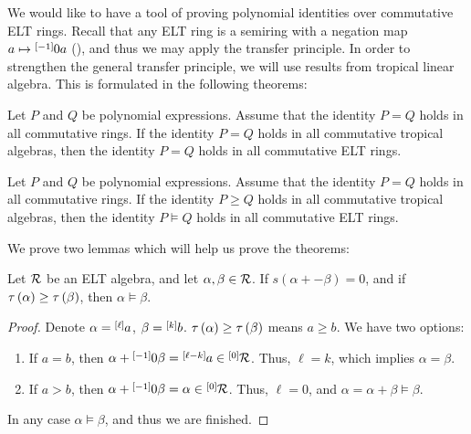 We would like to have a tool of proving polynomial identities over commutative ELT rings. Recall that any ELT ring is a semiring with a negation map $a\mapsto\layer{0}{-1}a$ (), and thus we may apply the transfer principle. In order to strengthen the general transfer principle, we will use results from tropical linear algebra. This is formulated in the following theorems:

\begin{thm}\label{thm:Trans-Princ}
Let $P$ and $Q$ be polynomial expressions. Assume that the identity $P=Q$ holds in all commutative rings. If the identity $P=Q$ holds in all commutative tropical algebras, then the identity $P=Q$ holds in all commutative ELT rings.
\end{thm}

\begin{thm}\label{thm:Trans-Princ-Surpass}
Let $P$ and $Q$ be polynomial expressions. Assume that the identity $P=Q$ holds in all commutative rings. If the identity $P\ge Q$ holds in all commutative tropical algebras, then the identity $P\vDash Q$ holds in all commutative ELT rings.
\end{thm}

We prove two lemmas which will help us prove the theorems:

\begin{lem}\label{lem:sum-zero-one-big-surpass}
Let $\R$ be an ELT algebra, and let $\alpha,\beta\in\R$. If $s\left(\alpha+\minus\beta\right)=0$, and if $\t\left(\alpha\right)\ge\t\left(\beta\right)$, then $\alpha\vDash\beta$.
\end{lem}
\begin{proof}
Denote $\alpha=\layer{a}{\ell}$, $\beta=\layer{b}{k}$. $\t\left(\alpha\right)\ge\t\left(\beta\right)$ means $a\ge b$. We have two options:
\begin{enumerate}
\item If $a=b$, then $\alpha+\minus\beta=\layer{a}{\ell-k}\in\zeroset{\R}$. Thus, $\ell=k$, which implies $\alpha=\beta$.
\item If $a>b$, then $\alpha+\minus\beta=\alpha\in\zeroset{\R}$. Thus, $\ell=0$, and $\alpha=\alpha+\beta\vDash\beta$.
\end{enumerate}
In any case $\alpha\vDash\beta$, and thus we are finished.
\end{proof}

